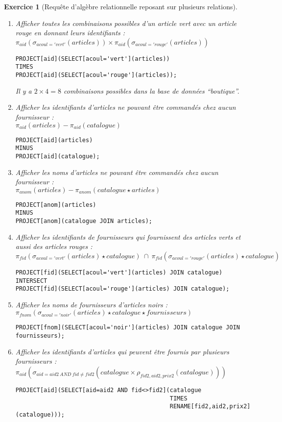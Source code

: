 \documentclass{article}
\theoremstyle{exostyle}
\newtheorem{exercice}{Exercice}
\newenvironment{questions}{

\begin{enumerate}[\hspace{12pt}\bfseries\itshape 1.]}{
\end{enumerate}

} %
\begin{document}
\begin{exercice}[Requête d'algèbre relationnelle reposant sur plusieurs relations]
\begin{questions}
\item Afficher toutes les combinaisons possibles d'un article vert avec un article rouge en donnant leurs identifiants :\\
  $\pi_{aid}(\sigma_{acoul='vert'}(articles)) \times \pi_{aid}(\sigma_{acoul='rouge'}(articles))$
\begin{verbatim}
PROJECT[aid](SELECT[acoul='vert'](articles))
TIMES
PROJECT[aid](SELECT[acoul='rouge'](articles));
\end{verbatim}
Il y a $2\times 4 = 8$ combinaisons possibles dans la base de données ``boutique''.

\item Afficher les identifiants d'articles ne pouvant être commandés chez aucun fournisseur :\\
  $\pi_{aid}(articles) - \pi_{aid}(catalogue)$
\begin{verbatim}
PROJECT[aid](articles)
MINUS
PROJECT[aid](catalogue);
\end{verbatim}

\item Afficher les noms d'articles ne pouvant être commandés chez aucun fournisseur :\\
  $\pi_{anom}(articles) - \pi_{anom}(catalogue \star articles)$
\begin{verbatim}
PROJECT[anom](articles)
MINUS
PROJECT[anom](catalogue JOIN articles);
\end{verbatim}

\item Afficher les identifiants de fournisseurs qui fournissent des articles verts et aussi des articles rouges :\\
  $\pi_{fid}(\sigma_{acoul='vert'}(articles) \star catalogue)\ \cap\ \pi_{fid}(\sigma_{acoul='rouge'}(articles) \star catalogue)$
\begin{verbatim}
PROJECT[fid](SELECT[acoul='vert'](articles) JOIN catalogue)
INTERSECT
PROJECT[fid](SELECT[acoul='rouge'](articles) JOIN catalogue);
\end{verbatim}

\item Afficher les noms de fournisseurs d'articles noirs :\\
  $\pi_{fnom}(\sigma_{acoul='noir'}(articles) \star catalogue \star fournisseurs)$
\begin{verbatim}
PROJECT[fnom](SELECT[acoul='noir'](articles) JOIN catalogue JOIN fournisseurs);
\end{verbatim}

\item Afficher les identifiants d'articles qui peuvent être fournis par plusieurs fournisseurs :\\
  $\pi_{aid}(\sigma_{aid=aid2\ AND\ fid\neq fid2}(catalogue \times \rho_{fid2,aid2,prix2}(catalogue)))$
\begin{verbatim}
PROJECT[aid](SELECT[aid=aid2 AND fid<>fid2](catalogue
                                            TIMES
                                            RENAME[fid2,aid2,prix2](catalogue)));
\end{verbatim}


\end{questions}
\end{exercice}
\end{document}
